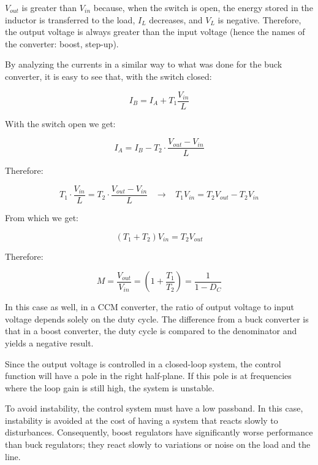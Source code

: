 \documentclass[../main.tex]{subfiles}
\begin{document}
$V_{out}$ is greater than $V_{in}$ because, when the switch is open, the energy stored in the inductor is transferred to the load, $I_L$ decreases, and $V_L$ is negative. Therefore, the output voltage is always greater than the input voltage (hence the names of the converter: boost, step-up).

By analyzing the currents in a similar way to what was done for the buck converter, it is easy to see that, with the switch closed:

\begin{equation}
	I_B = I_A + T_1 \frac{V_{in}}{L}
\end{equation}

With the switch open we get:

\begin{equation}
	I_A = I_B - T_2 \cdot \frac{V_{out} - V_{in}}{L}
\end{equation}

Therefore:

\begin{equation}
	T_1 \cdot \frac{V_{in}}{L} = T_2 \cdot \frac{V_{out} - V_{in}}{L} \hspace{10pt} \longrightarrow \hspace{10pt} T_1V_{in} = T_2V_{out} - T_2V_{in}
\end{equation}

From which we get:

\begin{equation}
	(T_1 + T_2)V_{in} = T_2V_{out}
\end{equation}

Therefore:

\begin{equation}
	M = \frac{V_{out}}{V_{in}} = \left( 1 + \frac{T_1}{T_2} \right) = \frac{1}{1 - D_C}
\end{equation}

In this case as well, in a CCM converter, the ratio of output voltage to input voltage depends solely on the duty cycle. The difference from a buck converter is that in a boost converter, the duty cycle is compared to the denominator and yields a negative result.

Since the output voltage is controlled in a closed-loop system, the control function will have a pole in the right half-plane. If this pole is at frequencies where the loop gain is still high, the system is unstable.

To avoid instability, the control system must have a low passband. In this case, instability is avoided at the cost of having a system that reacts slowly to disturbances. Consequently, boost regulators have significantly worse performance than buck regulators; they react slowly to variations or noise on the load and the line.
\end{document}
